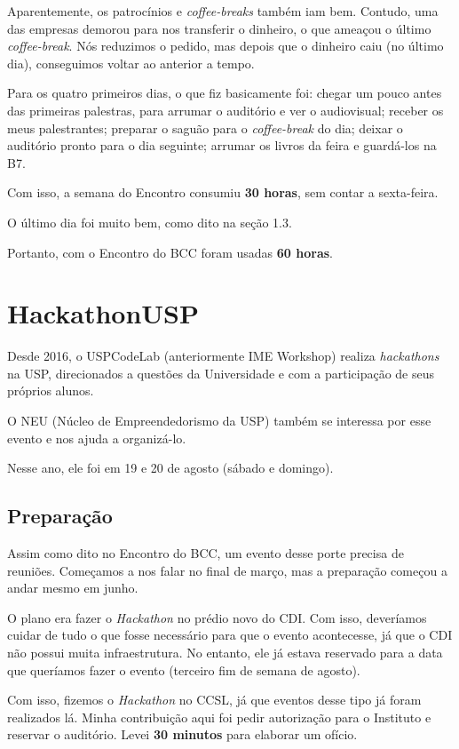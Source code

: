 \documentclass[12pt,letterpaper]{article}
\begin{document}
	Aparentemente, os patrocínios e \textit{coffee-breaks} também iam bem. Contudo, uma das empresas demorou para nos transferir o dinheiro, o que ameaçou o último \textit{coffee-break}. Nós reduzimos o pedido, mas depois que o dinheiro caiu (no último dia), conseguimos voltar ao anterior a tempo.
	
	Para os quatro primeiros dias, o que fiz basicamente foi: chegar um pouco antes das primeiras palestras, para arrumar o auditório e ver o audiovisual; receber os meus palestrantes; preparar o saguão para o \textit{coffee-break} do dia; deixar o auditório pronto para o dia seguinte; arrumar os livros da feira e guardá-los na B7.
	
	Com isso, a semana do Encontro consumiu \textbf{30 horas}, sem contar a sexta-feira.
	
	O último dia foi muito bem, como dito na seção 1.3.
	
	Portanto, com o Encontro do BCC foram usadas \textbf{60 horas}.
	
	\section{HackathonUSP}
	
	Desde 2016, o USPCodeLab (anteriormente IME Workshop) realiza \textit{hackathons} na USP, direcionados a questões da Universidade e com a participação de seus próprios alunos.
	
	O NEU (Núcleo de Empreendedorismo da USP) também se interessa por esse evento e nos ajuda a organizá-lo.
	
	Nesse ano, ele foi em 19 e 20 de agosto (sábado e domingo).
	
	\subsection{Preparação}
	
	Assim como dito no Encontro do BCC, um evento desse porte precisa de reuniões. Começamos a nos falar no final de março, mas a preparação começou a andar mesmo em junho.
	
	O plano era fazer o \textit{Hackathon} no prédio novo do CDI. Com isso, deveríamos cuidar de tudo o que fosse necessário para que o evento acontecesse, já que o CDI não possui muita infraestrutura. No entanto, ele já estava reservado para a data que queríamos fazer o evento (terceiro fim de semana de agosto).
	
	Com isso, fizemos o \textit{Hackathon} no CCSL, já que eventos desse tipo já foram realizados lá. Minha contribuição aqui foi pedir autorização para o Instituto e reservar o auditório. Levei \textbf{30 minutos} para elaborar um ofício. 
	
\end{document}
